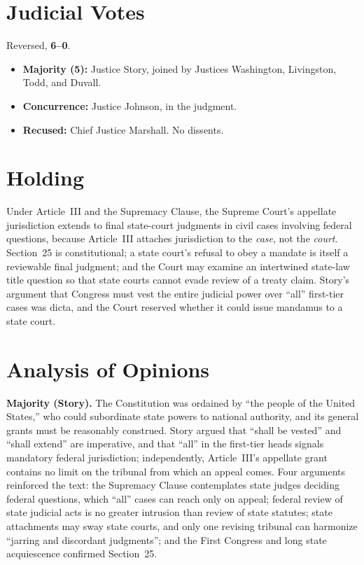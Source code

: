 \documentclass[12pt]{article}
\begin{document}
\section{Judicial Votes}

Reversed, \textbf{6--0}.
\begin{itemize}
\item \textbf{Majority (5):} Justice Story, joined by Justices Washington, Livingston, Todd, and Duvall.
\item \textbf{Concurrence:} Justice Johnson, in the judgment.
\item \textbf{Recused:} Chief Justice Marshall. No dissents.
\end{itemize}

\section{Holding}

Under Article~III and the Supremacy Clause, the Supreme Court's appellate jurisdiction extends to final state-court judgments in civil cases involving federal questions, because Article~III attaches jurisdiction to the \textit{case}, not the \textit{court}. Section~25 is constitutional; a state court's refusal to obey a mandate is itself a reviewable final judgment; and the Court may examine an intertwined state-law title question so that state courts cannot evade review of a treaty claim. Story's argument that Congress must vest the entire judicial power over ``all'' first-tier cases was dicta, and the Court reserved whether it could issue mandamus to a state court.

\section{Analysis of Opinions}

\textbf{Majority (Story).} The Constitution was ordained by ``the people of the United States,'' who could subordinate state powers to national authority, and its general grants must be reasonably construed. Story argued that ``shall be vested'' and ``shall extend'' are imperative, and that ``all'' in the first-tier heads signals mandatory federal jurisdiction; independently, Article~III's appellate grant contains no limit on the tribunal from which an appeal comes. Four arguments reinforced the text: the Supremacy Clause contemplates state judges deciding federal questions, which ``all'' cases can reach only on appeal; federal review of state judicial acts is no greater intrusion than review of state statutes; state attachments may sway state courts, and only one revising tribunal can harmonize ``jarring and discordant judgments''; and the First Congress and long state acquiescence confirmed Section~25.
\end{document}
